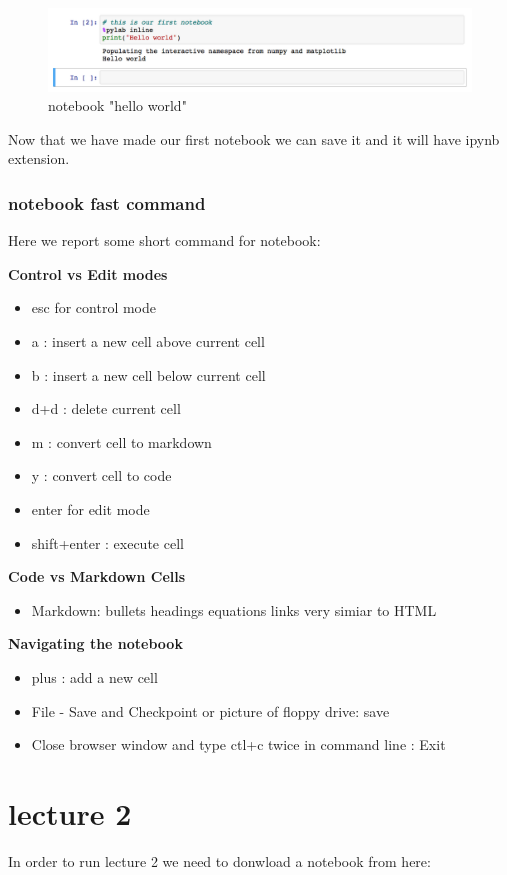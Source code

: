 \documentclass[11pt]{book}
\begin{document}
\begin{figure}[!]
\includegraphics[scale=.45]{figures/helloworld.png}
\caption{notebook "hello world"}
\end{figure}

Now that we have made our first notebook we can save it and it will have ipynb extension.


\subsection{notebook fast command}
Here we report some short command for notebook:

{\bf Control vs Edit modes}
\begin{itemize}
\item esc for control mode
\item a : insert a new cell above current cell
\item b : insert a new cell below current cell
\item d+d : delete current cell
\item m : convert cell to markdown
\item y : convert cell to code
\item enter for edit mode
\item shift+enter : execute cell
\end{itemize}

{ \bf Code vs Markdown Cells}
\begin{itemize}
\item Markdown:
\subitem bullets
\subitem headings
\subitem equations
\subitem links
\subitem very simiar to HTML
\end{itemize}
{\bf Navigating the notebook}
\begin{itemize}
\item plus : add a new cell
\item File - Save and Checkpoint or picture of floppy drive: save
\item Close browser window and type ctl+c twice in command line : Exit
\end{itemize}

\chapter{lecture 2}
In order to run lecture 2 we need to donwload a notebook from here:









\end{document}
